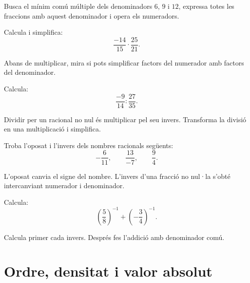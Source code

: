 \begin{indicacio}
	Busca el mínim comú múltiple dels denominadors \(6\), \(9\) i \(12\), expressa totes les fraccions amb aquest denominador i opera els numeradors.
\end{indicacio}

\begin{exercici}
	Calcula i simplifica:
	\[
	\frac{-14}{15}\cdot\frac{25}{21}.
	\]
\end{exercici}

\begin{indicacio}
	Abans de multiplicar, mira si pots simplificar factors del numerador amb factors del denominador.
\end{indicacio}

\begin{exercici}
	Calcula:
	\[
	\frac{-9}{14}:\frac{27}{35}.
	\]
\end{exercici}

\begin{indicacio}
	Dividir per un racional no nul és multiplicar pel seu invers. Transforma la divisió en una multiplicació i simplifica.
\end{indicacio}

\begin{exercici}
	Troba l'oposat i l'invers dels nombres racionals següents:
	\[
	-\frac{6}{11},
	\qquad
	\frac{13}{-7},
	\qquad
	\frac{9}{4}.
	\]
\end{exercici}

\begin{indicacio}
	L'oposat canvia el signe del nombre. L'invers d'una fracció no nul·la s'obté intercanviant numerador i denominador.
\end{indicacio}

\begin{exercici}
	Calcula:
	\[
	\left(\frac{5}{8}\right)^{-1}
	+
	\left(-\frac{3}{4}\right)^{-1}.
	\]
\end{exercici}

\begin{indicacio}
	Calcula primer cada invers. Després fes l'addició amb denominador comú.
\end{indicacio}

\section{Ordre, densitat i valor absolut}


